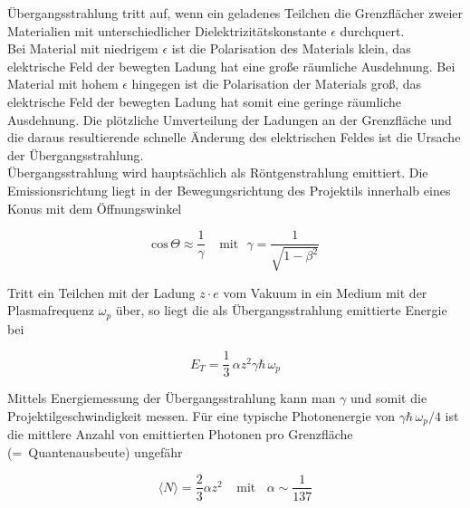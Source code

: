 Übergangsstrahlung tritt auf, wenn ein geladenes Teilchen die Grenzflächer zweier Materialien mit
unterschiedlicher Dielektrizitätskonstante $\epsilon$ durchquert.
\\
Bei Material mit niedrigem $\epsilon$ ist die Polarisation des Materials klein, das elektrische Feld
der bewegten Ladung hat eine große räumliche Ausdehnung. Bei Material mit hohem $\epsilon$ hingegen
ist die Polarisation der Materials groß, das elektrische Feld der bewegten Ladung hat somit eine
geringe räumliche Ausdehnung. Die plötzliche Umverteilung der Ladungen an der Grenzfläche und die
daraus resultierende schnelle Änderung des elektrischen Feldes ist die Ursache der
Übergangsstrahlung.
\\
Übergangsstrahlung wird hauptsächlich als Röntgenstrahlung emittiert. Die Emissionsrichtung liegt in
der Bewegungsrichtung des Projektils innerhalb eines Konus mit dem Öffnungswinkel

\[\text{cos}\,\Theta \approx \frac{1}{\gamma}~~~~~\text{mit}~~~\gamma=\frac{1}{\sqrt{1-\beta^2}}  \]

Tritt ein Teilchen mit der Ladung $z\cdot e$ vom Vakuum in ein Medium mit der Plasmafrequenz
$\omega_p$ über, so liegt die als Übergangsstrahlung emittierte Energie bei

\[E_T = \frac{1}{3}\, \alpha z^2 \gamma \hbar \,\omega_p \]

Mittels Energiemessung der Übergangsstrahlung kann man $\gamma$ und somit die
Projektilgeschwindigkeit messen. Für eine typische Photonenergie von $\gamma \hbar \,\omega_p/4$ ist
die mittlere Anzahl von emittierten Photonen pro Grenzfläche (=~Quantenausbeute) ungefähr

\[ \langle N \rangle = \frac{2}{3}\alpha z^2~~~~~\text{mit}~~~~\alpha\sim \frac{1}{137}  \]
